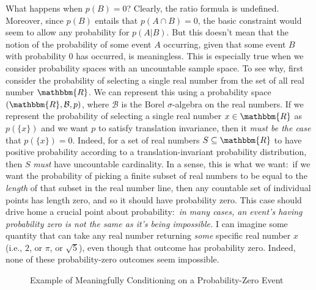 \documentclass[11pt]{article}
\theoremstyle{definition}
\theoremstyle{remark}
\begin{document}
What happens when $p(B)=0$? Clearly, the ratio formula is undefined. Moreover, since $p(B)$ entails that $p(A\cap B)=0$, the basic constraint would seem to allow any probability for $p(A|B)$. But this doesn't mean that the notion of the probability of some event $A$ occurring, given that some event $B$ with probability $0$ has occurred, is meaningless. This is especially true when we consider probability spaces with an uncountable sample space. To see why, first consider the probability of selecting a single real number from the set of all real number $\mathbbm{R}$. We can represent this using a probability space $(\mathbbm{R},\mathcal{B},p)$, where $\mathcal{B}$ is the Borel $\sigma$-algebra on the real numbers. If we represent the probability of selecting a single real number $x\in\mathbbm{R}$ as $p(\{x\})$ and we want $p$ to satisfy translation invariance, then it \textit{must be the case }that $p(\{x\})=0$. Indeed, for a set of real numbers $S\subseteq\mathbbm{R}$ to have positive probability according to a translation-invariant probability distribution, then $S$ \textit{must} have uncountable cardinality. In a sense, this is what we want:\ if we want the probability of picking a finite subset of real numbers to be equal to the \textit{length} of that subset in the real number line, then any countable set of individual points has length zero, and so it should have probability zero. This case should drive home a crucial point about probability:\ \textit{in many cases, an event's having probability zero is not the same as it's being impossible.} I can imagine some quantity that can take any real number returning \textit{some} specific real number $x$ (i.e., $2$, or $\pi$, or $\sqrt{5}$), even though that outcome has probability zero. Indeed, none of these probability-zero outcomes seem impossible.\par

\begin{figure}[]
\centering
{}
\caption{Example of Meaningfully Conditioning on a Probability-Zero Event}
\label{fig:box}
\end{figure}
\end{document}
